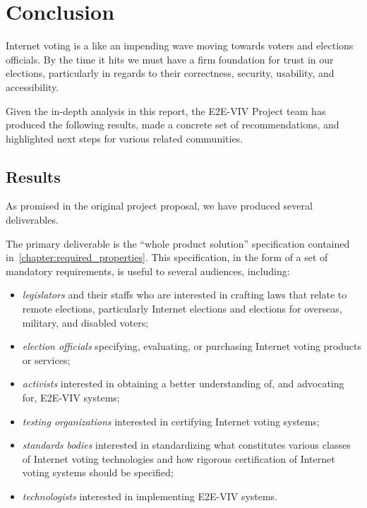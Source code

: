 \chapter{Conclusion}
\label{chapter:conclusion}

Internet voting is a like an impending wave moving towards voters and
elections officials. By the time it hits we must have a firm
foundation for trust in our elections, particularly in regards to
their correctness, security, usability, and accessibility.

Given the in-depth analysis in this report, the E2E-VIV Project team
has produced the following results, made a concrete set of
recommendations, and highlighted next steps for various related
communities.

\section{Results}

As promised in the original project proposal, we have produced several
deliverables.

The primary deliverable is the ``whole product solution''
specification contained in~\autoref{chapter:required_properties}. This
specification, in the form of a set of mandatory requirements, is
useful to several audiences, including:
\begin{itemize}
\item \emph{legislators} and their staffs who are interested in
  crafting laws that relate to remote elections, particularly Internet
  elections and elections for overseas, military, and disabled voters;
\item \emph{election officials} specifying, evaluating, or purchasing
  Internet voting products or services;
\item \emph{activists} interested in obtaining a better understanding
  of, and advocating for, E2E-VIV systems;
\item \emph{testing organizations} interested in certifying Internet voting
  systems;
\item \emph{standards bodies} interested in standardizing what
  constitutes various classes of Internet voting technologies and how
  rigorous certification of Internet voting systems should be
  specified;
\item \emph{technologists} interested in implementing E2E-VIV systems.
\end{itemize}

